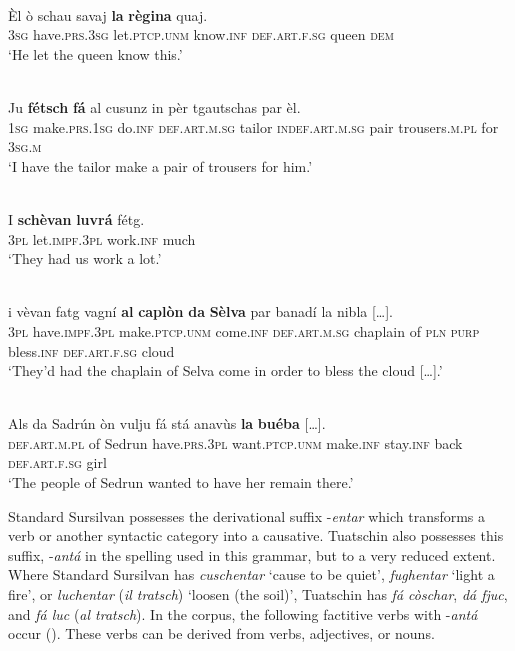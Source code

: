 \ea
\label{}
\\
\gll    Èl ò schau savaj \textbf{la} \textbf{règina} quaj.\\
     \textsc{3sg} have.\textsc{prs.3sg} let.\textsc{ptcp.unm} know.\textsc{inf} \textsc{def.art.f.sg} queen \textsc{dem}\\
\glt `He let the queen know this.'
\z


\ea
\label{}
\\
\gll Ju \textbf{fétsch} \textbf{fá} al cusunz in pèr tgautschas par èl.\\
\textsc{1sg} make.\textsc{prs.1sg} do.\textsc{inf} \textsc{def.art.m.sg} tailor \textsc{indef.art.m.sg} pair trousers.\textsc{m.pl} for \textsc{3sg.m}\\
\glt `I have the tailor make a pair of trousers for him.'
\z


\ea
\label{}
\\
	\gll I \textbf{schèvan} \textbf{luvrá} fétg.\\
{}	\textsc{3pl} let.\textsc{impf.3pl} work.\textsc{inf} much\\
\glt `They had us work a lot.'
\z

\ea\label{}
 {\citealt[62]{Büchli1966}}\\
\gll    […] i vèvan fatg vagní \textbf{al} \textbf{caplòn} \textbf{da} \textbf{Sèlva} par banadí la nibla […].\\
{}   \textsc{3pl} have.\textsc{impf.3pl} make.\textsc{ptcp.unm} come.\textsc{inf} \textsc{def.art.m.sg} chaplain of \textsc{pln} \textsc{purp} bless.\textsc{inf} \textsc{def.art.f.sg} cloud\\
\glt `They’d had the chaplain of Selva come in order to bless the cloud […].'
\z

\ea\label{}
 {\citealt[131]{Büchli1966}}\\
\gll     Als da Sadrún òn vulju fá stá anavùs \textbf{la} \textbf{buéba} […].\\
 \textsc{def.art.m.pl} of Sedrun have.\textsc{prs.3pl} want.\textsc{ptcp.unm} make.\textsc{inf} stay.\textsc{inf} back \textsc{def.art.f.sg} girl\\
\glt `The people of Sedrun wanted to have her remain there.'
\z

Standard Sursilvan possesses the derivational suffix -\textit{entar} which transforms a verb or another syntactic category into a causative. Tuatschin also possesses this suffix, -\textit{antá} in the spelling used in this grammar, but to a very reduced extent. Where Standard Sursilvan has \textit{cuschentar} `cause to be quiet', \textit{fughentar} `light a fire', or \textit{luchentar} (\textit{il tratsch}) `loosen (the soil)', Tuatschin has \textit{fá còschar}, \textit{dá fjuc}, and \textit{fá luc} (\textit{al tratsch}). In the corpus, the following factitive verbs with -\textit{antá} occur (). These verbs can be derived from verbs, adjectives, or nouns.

